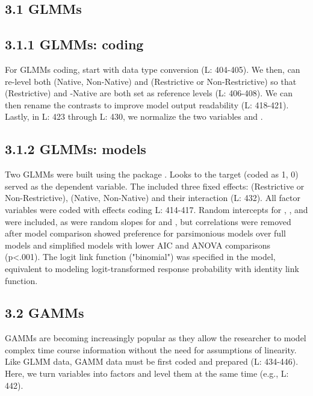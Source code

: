 \subsection{3.1 GLMMs}

\subsection{3.1.1 GLMMs: coding}

For GLMMs coding, start with data type conversion (L: 404-405). We then, can re-level both (Native, Non-Native) and (Restrictive or Non-Restrictive) so that (Restrictive) and -Native are both set as reference levels (L: 406-408).  We can then rename the contrasts to improve model output readability (L: 418-421). Lastly, in L: 423 through L: 430, we normalize the two variables  and .



\subsection{3.1.2 GLMMs: models}

Two GLMMs were built using the  package \parencite{Bates2014-eq}.  Looks to the target (coded as 1, 0) served as the dependent variable. The  included three fixed effects:  (Restrictive or Non-Restrictive), (Native, Non-Native) and their interaction (L: 432). All factor variables were coded with effects coding L: 414-417. Random intercepts for ,
, and
 were included, as were random slopes for  and , but correlations were removed after model comparison showed preference for parsimonious models over full models and simplified models with lower AIC and ANOVA comparisons (p<.001). The logit link function ("binomial") was specified in the model, equivalent to modeling logit-transformed response probability with identity link function. 





\subsection{3.2 GAMMs}
GAMMs are becoming increasingly popular as they allow the researcher to model complex time course information without the need for assumptions of linearity. Like GLMM data, GAMM data must be first coded and prepared (L: 434-446). Here, we turn variables into factors and level them at the same time (e.g., L: 442). 

